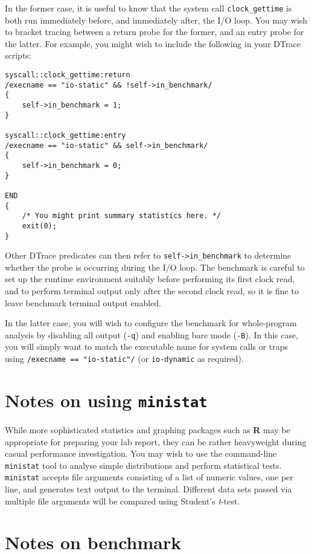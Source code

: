 \documentclass[a4paper,10pt]{article}
\begin{document}
In the former case, it is useful to know that the system call
\texttt{clock\_gettime} is both run immediately before, and immediately after,
the I/O loop.
You may wish to bracket tracing between a return probe for the former, and an
entry probe for the latter.
For example, you might wish to include the following in your DTrace scripts:

\begin{verbatim}
syscall::clock_gettime:return
/execname == "io-static" && !self->in_benchmark/
{
    self->in_benchmark = 1;
}

syscall::clock_gettime:entry
/execname == "io-static" && self->in_benchmark/
{
    self->in_benchmark = 0;
}

END
{
    /* You might print summary statistics here. */
    exit(0);
}
\end{verbatim}

\noindent
Other DTrace predicates can then refer to \texttt{self->in\_benchmark} to
determine whether the probe is occurring during the I/O loop.
The benchmark is careful to set up the runtime environment suitably before
performing its first clock read, and to perform terminal output only after the
second clock read, so it is fine to leave benchmark terminal output enabled.

In the latter case, you will wish to configure the benchmark for whole-program
analysis by disabling all output (\texttt{-q}) and enabling bare mode
(\texttt{-B}).
In this case, you will simply want to match the executable name for system
calls or traps using \texttt{/execname == "io-static"/} (or
\texttt{io-dynamic} as required).

\section*{Notes on using \texttt{ministat}}

While more sophisticated statistics and graphing packages such as \textbf{R}
may be appropriate for preparing your lab report, they can be rather
heavyweight during casual performance investigation.
You may wish to use the command-line \texttt{ministat} tool to analyse simple
distributions and perform statistical tests.
\texttt{ministat} accepts file arguments consisting of a list of numeric
values, one per line, and generates text output to the terminal.
Different data sets passed via multiple file arguments will be compared using
Student's \textit{t}-test.

\section*{Notes on benchmark}
\end{document}
